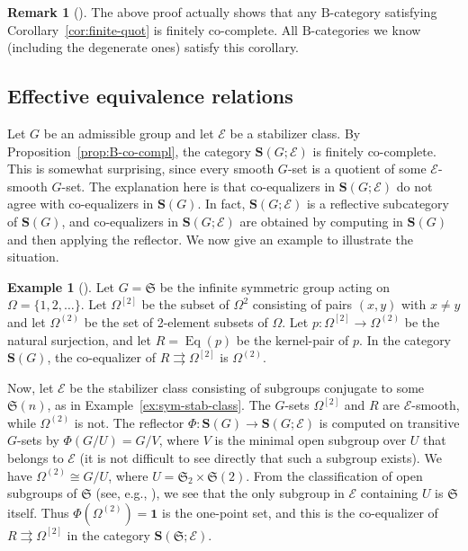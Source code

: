 \documentclass[12pt]{amsart}
\numberwithin{equation}{section}
\theoremstyle{definition}
\newtheorem{rmk}[equation]{Remark}
\newenvironment{remark}[1][]{\begin{rmk}[#1] \pushQED{\qed}}{\popQED \end{rmk}}
\newtheorem{eg}[equation]{Example}
\newenvironment{example}[1][]{\begin{eg}[#1] \pushQED{\qed}}{\popQED \end{eg}}
\newcommand{\rB}{\mathrm{B}}
\newcommand{\sE}{\mathscr{E}}
\newcommand{\bS}{\mathbf{S}}
\newcommand{\fS}{\mathfrak{S}}
\DeclareMathOperator{\Eq}{Eq}
\newcommand{\bone}{\mathbf{1}}
\begin{document}
\begin{remark}
The above proof actually shows that any $\rB$-category satisfying Corollary~\ref{cor:finite-quot} is finitely co-complete. All $\rB$-categories we know (including the degenerate ones) satisfy this corollary.
\end{remark}

\subsection{Effective equivalence relations}

Let $G$ be an admissible group and let $\sE$ be a stabilizer class. By Proposition~\ref{prop:B-co-compl}, the category $\bS(G; \sE)$ is finitely co-complete. This is somewhat surprising, since every smooth $G$-set is a quotient of some $\sE$-smooth $G$-set. The explanation here is that co-equalizers in $\bS(G; \sE)$ do not agree with co-equalizers in $\bS(G)$. In fact, $\bS(G; \sE)$ is a reflective subcategory of $\bS(G)$, and co-equalizers in $\bS(G; \sE)$ are obtained by computing in $\bS(G)$ and then applying the reflector. We now give an example to illustrate the situation.

\begin{example} \label{ex:ineffective}
Let $G=\fS$ be the infinite symmetric group acting on $\Omega=\{1,2,\ldots\}$. Let $\Omega^{[2]}$ be the subset of $\Omega^2$ consisting of pairs $(x,y)$ with $x \ne y$ and let $\Omega^{(2)}$ be the set of 2-element subsets of $\Omega$. Let $p \colon \Omega^{[2]} \to \Omega^{(2)}$ be the natural surjection, and let $R=\Eq(p)$ be the kernel-pair of $p$. In the category $\bS(G)$, the co-equalizer of $R \rightrightarrows \Omega^{[2]}$ is $\Omega^{(2)}$.

Now, let $\sE$ be the stabilizer class consisting of subgroups conjugate to some $\fS(n)$, as in Example~\ref{ex:sym-stab-class}. The $G$-sets $\Omega^{[2]}$ and $R$ are $\sE$-smooth, while $\Omega^{(2)}$ is not. The reflector $\Phi \colon \bS(G) \to \bS(G; \sE)$ is computed on transitive $G$-sets by $\Phi(G/U)=G/V$, where $V$ is the minimal open subgroup over $U$ that belongs to $\sE$ (it is not difficult to see directly that such a subgroup exists). We have $\Omega^{(2)} \cong G/U$, where $U=\fS_2 \times \fS(2)$. From the classification of open subgroups of $\fS$ (see, e.g., \cite[Proposition~15.1]{repst}), we see that the only subgroup in $\sE$ containing $U$ is $\fS$ itself. Thus $\Phi(\Omega^{(2)})=\bone$ is the one-point set, and this is the co-equalizer of $R \rightrightarrows \Omega^{[2]}$ in the category $\bS(\fS; \sE)$.
\end{example}
\end{document}

